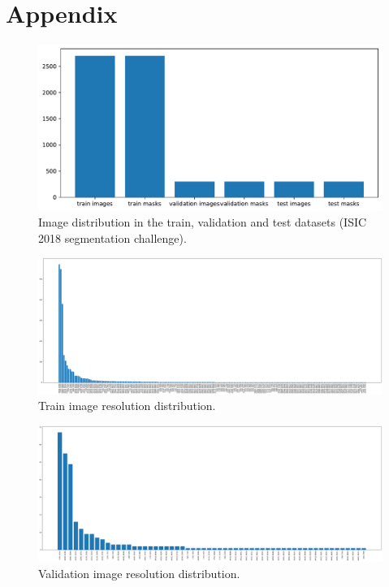 \section{Appendix}
\label{sec:appendix}

\begin{figure}[htb!]
  \centering
  \includegraphics[width=\textwidth]{assets/datasets.pdf}
  \caption[Datasets]
  {Image distribution in the train, validation and test datasets (ISIC 2018 segmentation challenge).}
  \label{datasets}
\end{figure}

\begin{figure}[htb!]
  \centering
  \includegraphics[width=\textwidth]{assets/train_image_resolutions.pdf}
  \caption{Train image resolution distribution.}
  \label{figure:1}
\end{figure}

\clearpage

\begin{figure}[htb!]
  \centering
  \includegraphics[width=\textwidth]{assets/valid_image_resolutions.pdf}
  \caption{Validation image resolution distribution.}
  \label{figure:2}
\end{figure}

